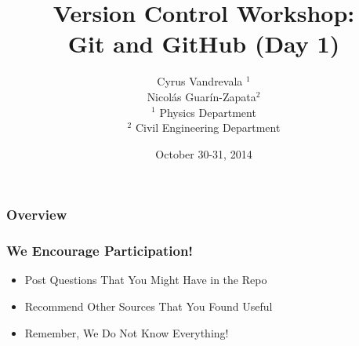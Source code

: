 



\title{Version Control Workshop: \\Git and GitHub (Day 1)}
\subtitle{}
\author[AUTHOR]{\scriptsize{Cyrus Vandrevala $^1$\\Nicol\'as Guar\'in-Zapata$^2$}\\
\tiny{$^1$ Physics Department\\ $^2$ Civil Engineering Department}}
\date{October 30-31, 2014}




\begin{frame}[plain]
\titlepage
\end{frame}
\note{}

\begin{frame}
\frametitle{\large{Overview}}
\tableofcontents
\end{frame}
\note{}

\begin{frame}
\frametitle{\large{We Encourage Participation!}}
\begin{itemize}
\item Post Questions That You Might Have in the Repo
\item Recommend Other Sources That You Found Useful
\item Remember, We Do Not Know Everything!
\end{itemize}
\end{frame}
\note{}















